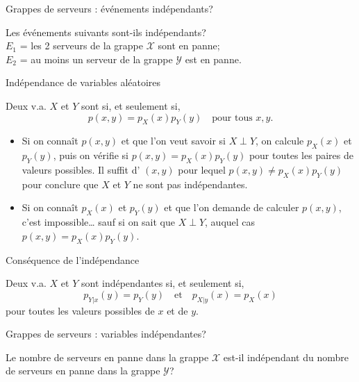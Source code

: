 \documentclass{BeamerTemplate}
\newcommand{\cibleReponse}{}
\newcommand{\lienreponse}[1]{\gdef\cibleReponse{#1}}
\begin{document}
\begin{frame}[t,label=exevenements]{Grappes de serveurs : événements indépendants?}

Les événements suivants sont-ils indépendants?\\[4pt]
$E_1$ = les 2 serveurs de la grappe $\mathcal{X}$ sont en panne;\\
$E_2$ = au moins un serveur de la grappe $\mathcal{Y}$ est en panne.

\lienreponse{rep-ex2}
\end{frame}


\begin{frame}[t]{Indépendance de variables aléatoires}

{\small
 \begin{defn}{}
   Deux v.a. $X$ et $Y$ sont  si, et seulement si,
   $$p(x,y)=p_X(x)p_Y(y) \quad\text{pour tous } x, y.$$
 \end{defn}
 \vspace{0.1in}
 \begin{itemize}\itemsep4pt
  \item Si on connaît $p(x,y)$ et que l'on veut savoir si $X\perp Y$, on calcule $p_X(x)$ et $p_Y(y)$,
  puis on vérifie si $p(x,y)=p_X(x)p_Y(y)$ pour toutes les paires de valeurs possibles.
  Il suffit d' $(x,y)$ pour lequel $p(x,y)\neq p_X(x)p_Y(y)$ pour conclure
  que $X$ et $Y$ ne sont pas indépendantes.
  \item Si on connaît $p_X(x)$ et $p_Y(y)$ et que l'on demande de calculer $p(x,y)$, c'est
  impossible\ldots{} sauf si on sait que $X\perp Y$, auquel cas $p(x,y)=p_X(x)p_Y(y)$.
 \end{itemize}
}
\end{frame}


\begin{frame}[t]{Conséquence de l'indépendance}

\begin{thm}{}
Deux v.a. $X$ et $Y$ sont indépendantes si, et seulement si,
$$p_{Y|x}(y)=p_{Y}(y)\quad\text{et}\quad p_{X|y}(x)=p_{X}(x)$$
pour toutes les valeurs possibles de $x$ et de $y$.
\end{thm}

\end{frame}


\begin{frame}[t,label=exindep]{Grappes de serveurs : variables indépendantes?}

Le nombre de serveurs en panne dans la grappe $\mathcal{X}$ est-il indépendant du nombre de serveurs
en panne dans la grappe $\mathcal{Y}$?

\lienreponse{rep-ex2}
\end{frame}
\end{document}
